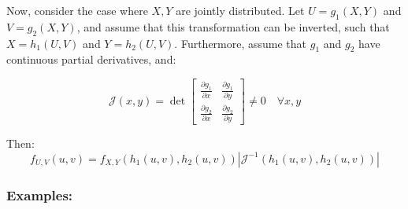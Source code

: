 \documentclass{article}
\begin{document}
Now, consider the case where $X,Y$ are jointly distributed. Let $U=g_1(X,Y)$ and $V=g_2(X,Y)$, and assume that this transformation can be inverted, such that $X = h_1(U,V)$ and $Y= h_2(U,V)$. Furthermore, assume that $g_1$ and $g_2$ have continuous partial derivatives, and:

\begin{equation*}
    \mathcal{J}(x,y) = \det\begin{bmatrix}
                    \frac{\partial g_1}{\partial x} & \frac{\partial g_1}{\partial y}\\
                    \frac{\partial g_2}{\partial x} & \frac{\partial g_2}{\partial y}
                \end{bmatrix} \neq 0 \quad \forall x,y
\end{equation*}

Then:
\begin{equation*}
    f_{U,V}(u,v) = f_{X,Y}\left(h_1(u,v),h_2(u,v)\right) \left|\mathcal{J}^{-1} \left(h_1(u,v),h_2(u,v)\right)\right|
\end{equation*}

\subsubsection*{Examples:}
\end{document}
